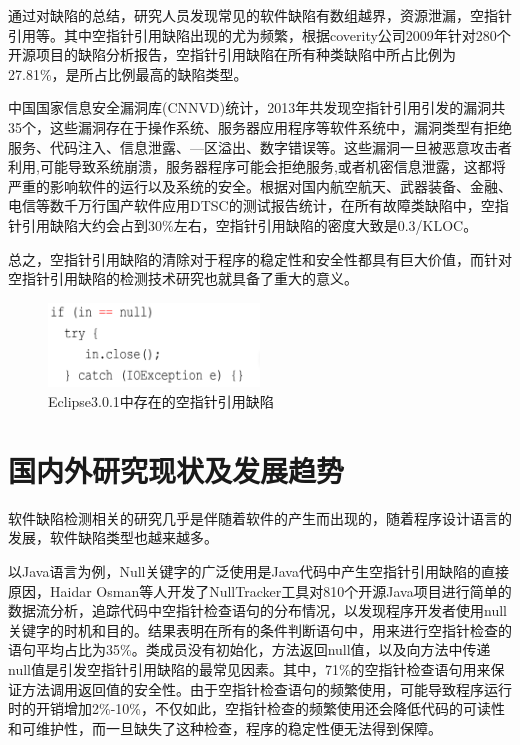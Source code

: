 通过对缺陷的总结，研究人员发现常见的软件缺陷有数组越界，资源泄漏，空指针引用等。其中空指针引用缺陷出现的尤为频繁，根据coverity公司2009年针对280个开源项目的缺陷分析报告，空指针引用缺陷在所有种类缺陷中所占比例为27.81\%，是所占比例最高的缺陷类型\cite{coverity2009}。


中国国家信息安全漏洞库(CNNVD)统计，2013年共发现空指针引用引发的漏洞共35个，这些漏洞存在于操作系统、服务器应用程序等软件系统中，漏洞类型有拒绝服务、代码注入、信息泄露、—区溢出、数字错误等。这些漏洞一旦被恶意攻击者利用,可能导致系统崩溃，服务器程序可能会拒绝服务,或者机密信息泄露，这都将严重的影响软件的运行以及系统的安全。根据对国内航空航天、武器装备、金融、电信等数千万行国产软件应用DTSC的测试报告统计，在所有故障类缺陷中，空指针引用缺陷大约会占到30\%左右，空指针引用缺陷的密度大致是0.3/KLOC。

总之，空指针引用缺陷的清除对于程序的稳定性和安全性都具有巨大价值，而针对空指针引用缺陷的检测技术研究也就具备了重大的意义。
 \begin{figure}
 \centering
 \includegraphics[width=0.50\textwidth]{figures/NullPointer1-1}
 \caption{Eclipse3.0.1中存在的空指针引用缺陷}\label{fig:figure1-1}
\end{figure}

\section{国内外研究现状及发展趋势}

软件缺陷检测相关的研究几乎是伴随着软件的产生而出现的，随着程序设计语言的发展，软件缺陷类型也越来越多。

以Java语言为例，Null关键字的广泛使用是Java代码中产生空指针引用缺陷的直接原因，Haidar Osman等人开发了NullTracker\cite{osman2016tracking}工具对810个开源Java项目进行简单的数据流分析，追踪代码中空指针检查语句的分布情况，以发现程序开发者使用null关键字的时机和目的。结果表明在所有的条件判断语句中，用来进行空指针检查的语句平均占比为35\%。类成员没有初始化，方法返回null值，以及向方法中传递null值是引发空指针引用缺陷的最常见因素。其中，71\%的空指针检查语句用来保证方法调用返回值的安全性。由于空指针检查语句的频繁使用，可能导致程序运行时的开销增加2\%-10\%，不仅如此，空指针检查的频繁使用还会降低代码的可读性和可维护性，而一旦缺失了这种检查，程序的稳定性便无法得到保障。

